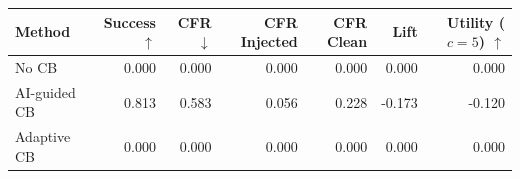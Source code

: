 \begin{tabular}{lrrrrrr}
\toprule
Method & Success $\uparrow$ & CFR $\downarrow$ & CFR Injected & CFR Clean & Lift & Utility ($c=5$) $\uparrow$ \\
\midrule
No CB & 0.000 & 0.000 & 0.000 & 0.000 & 0.000 & 0.000 \\
AI-guided CB & 0.813 & 0.583 & 0.056 & 0.228 & -0.173 & -0.120 \\
Adaptive CB & 0.000 & 0.000 & 0.000 & 0.000 & 0.000 & 0.000 \\
\bottomrule
\end{tabular}

